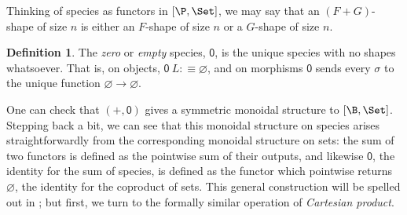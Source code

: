 \documentclass[preprint,authoryear]{sigplanconf}
\newcommand{\pref}[1]{\prettyref{#1}}
\newcommand{\term}[1]{\emph{#1}}
\newcommand{\msf}[1]{\ensuremath{\mathsf{#1}}\xspace}
\newcommand{\comp}{\mathbin{\circ}}
\let\oldequiv\equiv
\newcommand{\jeq}{\oldequiv}          %
\newcommand{\defeq}{\mathrel{:\jeq}}  %
\renewcommand{\equiv}{\simeq}         %
\theoremstyle{definition}
\newtheorem{defn}[thm]{Definition}
\theoremstyle{remark}
\newcommand{\cons}[1]{\ensuremath{\mathsf{#1}}}
\newcommand{\inl}{\cons{inl}}
\newcommand{\inr}{\cons{inr}}
\providecommand{\Sp}{}
\renewcommand{\Sp}{\msf}
\newcommand{\X}{\Sp{X}}
\newcommand{\Zero}{\msf{0}}
\newcommand{\One}{\msf{1}}
\providecommand{\comp}{\circ}
\begin{document}
Thinking of species as functors in $[\P, \Set]$, we may
say that an $(F+G)$-shape of size $n$ is either an $F$-shape of size
$n$ or a $G$-shape of size $n$.




\begin{defn}
  The \term{zero} or \term{empty} species,
  $\Zero$, is the unique species with no shapes whatsoever.  That is,
  on objects,
    $\Zero\ L \defeq \varnothing$,
  and on morphisms $\Zero$ sends every $\sigma$ to the unique function
  $\varnothing \to \varnothing$.
\end{defn}

%

One can check that $(+,\Zero)$ gives a symmetric monoidal structure
to $[\B, \Set]$.
Stepping back a bit, we can see that this monoidal structure on
species arises straightforwardly from the corresponding monoidal
structure on sets: the sum of two functors is defined as the pointwise
sum of their outputs, and likewise \Zero, the identity for the sum of
species, is defined as the functor which pointwise
returns $\varnothing$, the identity for the coproduct of sets.  This general
construction will be spelled out in \pref{sec:lifting-monoids}; but
first, we turn to the formally similar operation of \emph{Cartesian
  product}.
\end{document}

